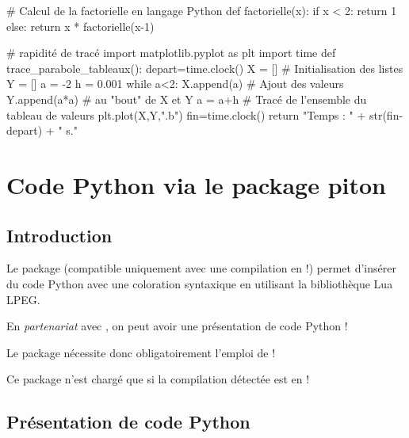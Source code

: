 \documentclass{article}
\newcommand\ctex[1]{\tcbox[vignettelatex]{#1}}
\begin{document}
\begin{codesortie}
\begin{scontents}[overwrite,write-out=testscript.py]
# Calcul de la factorielle en langage Python
def factorielle(x):
	if x < 2:
		return 1
	else:
		return x * factorielle(x-1)

# rapidité de tracé
import matplotlib.pyplot as plt
import time
def trace_parabole_tableaux():
	depart=time.clock()
	X = [] # Initialisation des listes
	Y = []
	a = -2
	h = 0.001
	while a<2:
		X.append(a) # Ajout des valeurs
		Y.append(a*a) # au "bout" de X et Y
		a = a+h
	# Tracé de l'ensemble du tableau de valeurs
	plt.plot(X,Y,".b")
	fin=time.clock()
	return "Temps : " + str(fin-depart) + " s."
\end{scontents}

\end{codesortie}

\newpage

\section{Code Python via le package piton}\label{pythonpiton}

\subsection{Introduction}

\begin{codeinfo}
Le package \ctex{piton} (compatible uniquement avec une compilation en \LuaLaTeX{} !) permet d'insérer du code Python avec une coloration syntaxique en utilisant la bibliothèque \textsf{Lua LPEG}.

\smallskip

En \textit{partenariat} avec \ctex{tcolorbox}, on peut avoir une présentation de code Python !
\end{codeinfo}

\begin{codeattention}
Le package \ctex{piton} nécessite donc obligatoirement l’emploi de \LuaLaTeX{} !

Ce package n'est chargé que si la compilation détectée est en \LuaLaTeX{} !
\end{codeattention}

\subsection{Présentation de code Python}
\end{document}
